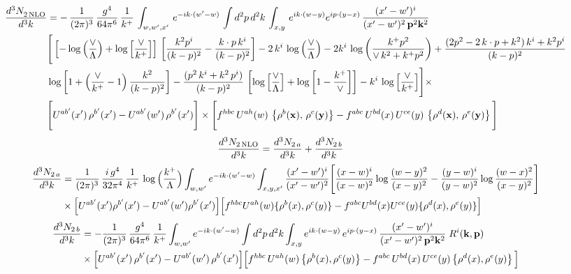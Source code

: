 \documentclass[9pt]{article}
\numberwithin{equation}{section}
\begin{document}
\begin{align}
   \frac{d^{3}N_{2\,\rm NLO}^{\rm}}{d^{3}k} &  = -\,\frac{1}{(2\pi)^{3}}\,\frac{g^{4}}{64\pi^{6}}\, \frac{1}{k^{+}}\,\int_{w,w',x'}\, e^{-ik\cdot (w'-w)}\,\int d^{2}p\,d^{2}k\,\int_{x,y}\, e^{ik\cdot (w-y)} e^{ip\cdot (y-x)}\, \frac{(x'-w')^{i}}{(x'-w')^{2}\,\mathbf{p}^{2}\mathbf{k}^{2} }\notag \\ & \Bigg[\left[-\log{\left(\frac{\vee}{\Lambda}\right)}+\log{\left[\frac{\vee}{k^{+}}\right]}\right]\,\left[\frac{k^{2}p^{i}}{(k-p)^{2}}-\frac{k\cdot p\,k^{i}}{(k-p)^{2}}\right]-2\,k^{i}\,\log{\left(\frac{\vee}{\Lambda}\right)} -2k^{i}\,\log{\left(\frac{k^{+}p^{2}}{\vee\, k^{2}+k^{+}p^{2}}\right)}+\frac{(2p^{2}-2\,k\cdot p + k^{2})\,k^{i} + k^{2}p^{i}}{(k-p)^{2}}\notag \\ &  \log{\left[1+\left(\frac{\vee}{k^{+}}-1\right)\frac{k^{2}}{(k-p)^{2}}\right]} - \frac{(p^{2}\,k^{i}+k^{2}\,p^{i})}{(k-p)^{2}}\,\left[\log{\left[\frac{\vee}{\Lambda}\right]}+\log{\left[1-\frac{k^{+}}{\vee}\right]}\right]-k^{i}\,\log{\left[\frac{\vee}{k^{+}}\right]}\Bigg]\times\,\notag \\ &  \Bigg[U^{ab'}(x')\,\rho^{b'}(x') - U^{ab'}(w')\,\rho^{b'}(x')\Bigg]\times\Bigg[f^{hbc}\,U^{ah}(w)\,\left\{ \rho^{b}(\mathbf{x}),\,\rho^{c}(\mathbf{y})\right\}-f^{abc}\,U^{bd}(x)\, U^{ce}(y)\, \left\{\rho^{d}(\mathbf{x}),\,\rho^{e}(\mathbf{y})\right\}\Bigg]
\end{align}
\begin{align}
\frac{d^{3}N_{2\,\rm NLO}}{d^{3}k} &= \frac{d^{3}N_{2\,a}}{d^{3}k} + \frac{d^{3}N_{2\,b}}{d^{3}k}
\end{align}
\begin{align}
\frac{d^{3}N_{2\,a}}{d^{3}k} & = \frac{1}{(2\pi)^{3}}\,\frac{i\,g^{4}}{32\pi^{4}}\,\frac{1}{k^{+}}\,\log\Big(\frac{k^{+}}{\Lambda}\Big)\int_{w,w'} e^{-ik\cdot(w'-w)}\int_{x,y,x'}\frac{(x'-w')^{i}}{(x'-w')^{2}}\Bigg[\frac{(x-w)^{i}}{(x-w)^{2}}\log\frac{(w-y)^{2}}{(x-y)^{2}}-\frac{(y-w)^{i}}{(y-w)^{2}}\log\frac{(w-x)^{2}}{(x-y)^{2}}\Bigg]\notag\\
&\times\Big[U^{ab'}(x')\rho^{b'}(x')-U^{ab'}(w')\rho^{b'}(x')\Big]\Big[f^{hbc}U^{ah}(w)\{\rho^{b}(x),\rho^{c}(y)\}-f^{abc}U^{bd}(x)U^{ce}(y)\{\rho^{d}(x),\rho^{e}(y)\}\Big]
\end{align}
\begin{align}
\frac{d^{3}N_{2\,b}}{d^{3}k} & = -\frac{1}{(2\pi)^{3}}\,\frac{g^{4}}{64\pi^{6}}\,\frac{1}{k^{+}}\int_{w,w'} e^{-ik\cdot(w'-w)}
\int d^{2}p\,d^{2}k\int_{x,y} e^{ik\cdot(w-y)}\,e^{ip\cdot(y-x)}\,\frac{(x'-w')^{i}}{(x'-w')^{2}\,\mathbf{p}^{2}\mathbf{k}^{2}}\;R^{i}(\mathbf{k},\mathbf{p})\notag\\
&\times\Big[U^{ab'}(x')\,\rho^{b'}(x')-U^{ab'}(w')\,\rho^{b'}(x')\Big]
\Big[f^{hbc}\,U^{ah}(w)\left\{\rho^{b}(x),\rho^{c}(y)\right\}-f^{abc}\,U^{bd}(x)\,U^{ce}(y)\left\{\rho^{d}(x),\rho^{e}(y)\right\}\Big]
\end{align}
\end{document}

